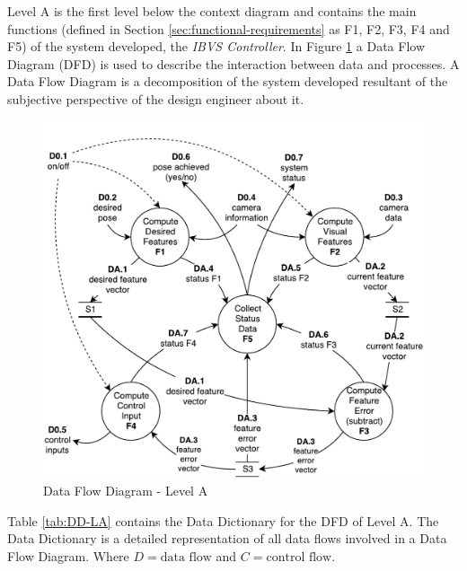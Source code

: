 Level A is the first level below the context diagram and contains the main functions (defined in Section \ref{sec:functional-requirements} as F1, F2, F3, F4 and F5) of the system developed, the \textit{IBVS Controller}. In Figure \ref{fig:sa_diag_02} a Data Flow Diagram (DFD) is used to describe the interaction between data and processes. A Data Flow Diagram \cite{Janschek2011} is a decomposition of the system developed resultant of the subjective perspective of the design engineer about it.


\begin{figure}[!htb]
	\centering
	\includegraphics[width=\textwidth]{content/chapter_03/images/sa_diagram_02.pdf}
	\caption{Data Flow Diagram - Level A}
	\label{fig:sa_diag_02}
\end{figure}

\pagebreak

Table \ref{tab:DD-LA} contains the Data Dictionary for the DFD of Level A. The Data Dictionary \cite{Janschek2011} is a detailed representation of all data flows involved in a Data Flow Diagram. Where $D = \text{data flow}$ and $C = \text{control flow}$.


